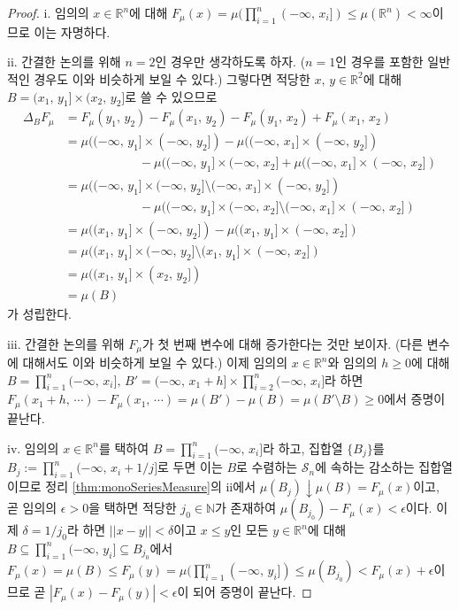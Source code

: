 \begin{proof}
    i. 임의의 $x\in\mathbb{R}^n$에 대해 $F_\mu(x)=\mu(\prod_{i=1}^n(-\infty,\,x_i])\leq\mu(\mathbb{R}^n)<\infty$이므로 이는 자명하다.

    ii. 간결한 논의를 위해 $n=2$인 경우만 생각하도록 하자. ($n=1$인 경우를 포함한 일반적인 경우도 이와 비슷하게 보일 수 있다.) 그렇다면 적당한 $x,\,y\in\mathbb{R}^2$에 대해 $B=(x_1,\,y_1]\times(x_2,\,y_2]$로 쓸 수 있으므로
    \begin{align*}
        \Delta_BF_\mu&=F_\mu(y_1,\,y_2)-F_\mu(x_1,\,y_2)-F_\mu(y_1,\,x_2)+F_\mu(x_1,\,x_2)\\
        &=\mu((-\infty,\,y_1]\times(-\infty,\,y_2])-\mu((-\infty,\,x_1]\times(-\infty,\,y_2])\\
        &\qquad\qquad\qquad-\mu((-\infty,\,y_1]\times(-\infty,\,x_2]+\mu((-\infty,\,x_1]\times(-\infty,\,x_2])\\
        &=\mu((-\infty,\,y_1]\times(-\infty,\,y_2]\setminus(-\infty,\,x_1]\times(-\infty,\,y_2])\\
        &\qquad\qquad\qquad-\mu((-\infty,\,y_1]\times(-\infty,\,x_2]\setminus(-\infty,\,x_1]\times(-\infty,\,x_2])\\
        &=\mu((x_1,\,y_1]\times(-\infty,\,y_2])-\mu((x_1,\,y_1]\times(-\infty,\,x_2])\\
        &=\mu((x_1,\,y_1]\times(-\infty,\,y_2]\setminus(x_1,\,y_1]\times(-\infty,\,x_2])\\
        &=\mu((x_1,\,y_1]\times(x_2,\,y_2])\\
        &=\mu(B)
    \end{align*}
    가 성립한다.

    iii. 간결한 논의를 위해 $F_\mu$가 첫 번째 변수에 대해 증가한다는 것만 보이자. (다른 변수에 대해서도 이와 비슷하게 보일 수 있다.) 이제 임의의 $x\in\mathbb{R}^n$와 임의의 $h\geq0$에 대해 $B=\prod_{i=1}^n(-\infty,\,x_i],\,B'=(-\infty,\,x_1+h]\times\prod_{i=2}^{n}(-\infty,\,x_i]$라 하면 $F_\mu(x_1+h,\,\cdots)-F_\mu(x_1,\,\cdots)=\mu(B')-\mu(B)=\mu(B'\setminus B)\geq0$에서 증명이 끝난다.

    iv. 임의의 $x\in\mathbb{R}^n$를 택하여 $B=\prod_{i=1}^n(-\infty,\,x_i]$라 하고, 집합열 $\{B_j\}$를 $B_j:=\prod_{i=1}^n(-\infty,\,x_i+1/j]$로 두면 이는 $B$로 수렴하는 $\mathcal{S}_n$에 속하는 감소하는 집합열이므로 정리 \ref{thm:monoSeriesMeasure}의 ii에서 $\mu(B_j)\downarrow\mu(B)=F_\mu(x)$이고, 곧 임의의 $\epsilon>0$을 택하면 적당한 $j_0\in\mathbb{N}$가 존재하여 $\mu(B_{j_0})-F_\mu(x)<\epsilon$이다. 이제 $\delta=1/j_0$라 하면 $||x-y||<\delta$이고 $x\leq y$인 모든 $y\in\mathbb{R}^n$에 대해 $B\subseteq\prod_{i=1}^n(-\infty,\,y_i]\subseteq B_{j_0}$에서 $F_\mu(x)=\mu(B)\leq F_\mu(y)=\mu(\prod_{i=1}^n(-\infty,\,y_i])\leq\mu(B_{j_0})<F_\mu(x)+\epsilon$이므로 곧 $|F_\mu(x)-F_\mu(y)|<\epsilon$이 되어 증명이 끝난다.


\end{proof}
